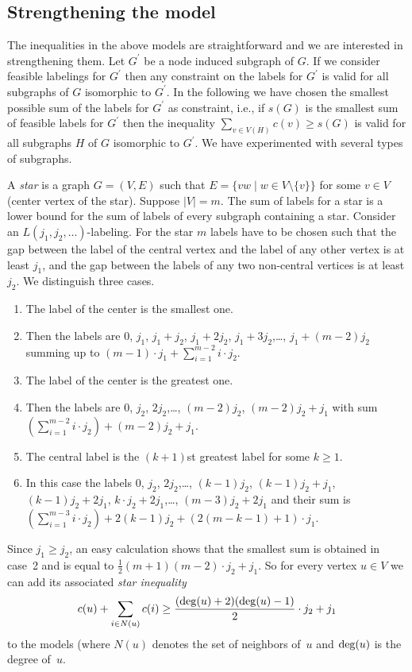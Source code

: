 \documentclass[smallextended]{svjour3}
\def\deg{\mathop{\rm deg}}
\begin{document}
\subsection{Strengthening the model} 

The inequalities in the above models are straightforward and we are 
interested in strengthening them. Let $G^\prime$ be a node induced subgraph of $G$. 
If we consider feasible labelings for $G^\prime$ then any constraint on the 
labels for $G^\prime$ is valid for all subgraphs of $G$ isomorphic to $G^\prime$. 
In the following we have chosen the smallest possible sum of the labels 
for $G^\prime$ as constraint, i.e., if $s(G)$ is the smallest sum of 
feasible labels for $G^\prime$ then the inequality $\sum_{v\in V(H)}c(v)\geq s(G)$ 
is valid for all subgraphs $H$ of $G$ isomorphic to $G^\prime$. 
We have experimented with several types of subgraphs. 

A \emph{star} is a graph $G=(V,E)$ such that $E=\{vw\mid w\in V\setminus\{v\}\}$ for some $v\in V$ 
(center vertex of the star). Suppose $|V|=m$. 
The sum of labels for a star is a lower bound for the sum of labels of every subgraph 
containing a star. Consider an $L(j_1,j_2,\ldots)$-labeling. For the star $m$ labels have 
to be chosen such that the gap between the label 
of the central vertex and the label of any other vertex is at least 
$j_1$, and the gap between the labels of any two non-central vertices 
is at least $j_2$. We distinguish three cases. 
\begin{enumerate} 
\item 
The label of the center is the smallest one. 
\item[]Then the labels are 0, $j_1$, 
$j_1+j_2$, $j_1+2j_2$, $j_1+3j_2$,\ldots , $j_1+(m-2)j_2$ 
summing up to $(m-1)\cdot j_1+\sum_{i=1}^{m-2}i\cdot j_2$. 
\item 
The label of the center is the greatest one. 
\item[]Then the labels are 0, $j_2$, 
$2j_2$,\ldots , $(m-2)j_2$, $(m-2)j_2+j_1$ with sum 
$(\sum_{i=1}^{m-2}i\cdot j_2)+(m-2)j_2+j_1$. 
\item 
The central label is the $(k+1)$st greatest label for some $k\ge1$. 
\item[]In this case the labels 0, $j_2$, 
$2j_2$,\ldots , $(k-1)j_2$, $(k-1)j_2+j_1$, $(k-1)j_2+2j_1$, 
$k\cdot j_2+2j_1$,\ldots , $(m-3)j_2+2j_1$ and their sum is 
$(\sum_{i=1}^{m-3}i\cdot j_2)+2(k-1)j_2+(2(m-k-1)+1)\cdot j_1$. 
\end{enumerate} 
Since $j_1\geq j_2$, an easy calculation shows that the smallest sum is obtained 
in case~2 and is equal to $\frac{1}{2}(m+1)(m-2)\cdot j_2+j_1$. 
So for every vertex $u\in V$ we can add its associated \emph{star inequality} 
\[ 
c(u)+\sum_{i\in N(u)}c(i)\geq\frac{(\deg(u)+2)(\deg(u)-1)}{2}\cdot j_2+j_1 
\] 
to the models (where $N(u)$ denotes the set of neighbors of~$u$ 
and $\deg(u)$ is the degree of~$u$. 
\end{document}

